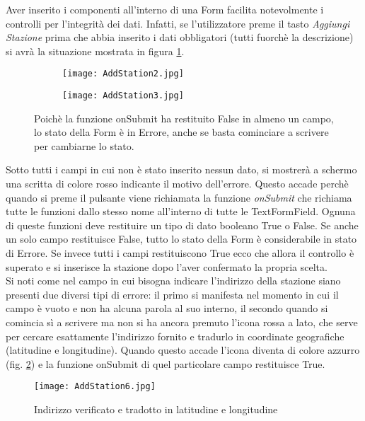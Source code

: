 Aver
inserito i componenti all'interno di una Form facilita notevolmente i controlli
per l'integrità dei dati. Infatti, se l'utilizzatore preme il tasto
\textit{Aggiungi Stazione} prima che abbia inserito i dati obbligatori (tutti
fuorchè la descrizione) si avrà la situazione mostrata in figura \ref{addStation2}.
\begin{figure}[!h]
    \centering
    \begin{subfigure}{0.3\linewidth}
        \texttt{[image: AddStation2.jpg]}
    \end{subfigure}
    \begin{subfigure}{0.3\linewidth}
        \texttt{[image: AddStation3.jpg]}
    \end{subfigure}
    \caption{Poichè la funzione onSubmit ha restituito False in almeno un campo,
    lo stato della Form è in Errore, anche se basta cominciare a scrivere
    per cambiarne lo stato.}
    \label{addStation2}
\end{figure}
Sotto tutti i campi in cui non è stato inserito nessun dato, si mostrerà a
schermo una scritta di colore rosso indicante il motivo dell'errore. Questo
accade perchè quando si preme il pulsante viene richiamata la funzione
\textit{onSubmit} che richiama tutte le funzioni dallo stesso nome all'interno
di tutte le TextFormField. Ognuna di queste funzioni deve restituire un tipo di
dato booleano
True o False. Se anche un solo campo restituisce False, tutto lo stato della
Form è considerabile in stato di Errore. Se invece tutti i campi restituiscono
True ecco che allora il controllo è superato e si inserisce la stazione dopo
l'aver confermato la propria scelta. \\
Si  noti come nel campo in cui bisogna indicare l'indirizzo della stazione siano
presenti due diversi tipi di errore: il primo si manifesta nel momento in cui il
campo è vuoto e non ha alcuna parola al suo interno, il secondo quando si
comincia sì a scrivere ma non si ha ancora premuto l'icona rossa a lato, che
serve per cercare esattamente l'indirizzo fornito e tradurlo in coordinate
geografiche (latitudine e longitudine). Quando questo accade l'icona diventa di
colore azzurro (fig. \ref{addStation6}) e la funzione onSubmit di quel particolare campo
restituisce True.
\begin{figure}[!h]
    \centering
    \texttt{[image: AddStation6.jpg]}
    \caption{Indirizzo verificato e tradotto in latitudine e longitudine}
    \label{addStation6}
\end{figure}  
